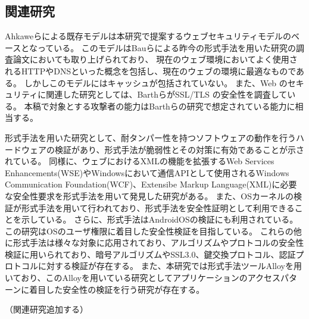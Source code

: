 \documentclass{css}
\begin{document}
\subsection{関連研究}
Ahkaweらによる既存モデル\cite{webmodel}は本研究で提案するウェブセキュリティモデルのベースとなっている。
このモデルはBauらによる昨今の形式手法を用いた研究の調査論文\cite{security_modeling_and_analysis}においても取り上げられており、
現在のウェブ環境においてよく使用されるHTTPやDNSといった概念を包括し、現在のウェブの環境に最適なものである。
しかしこのモデルにはキャッシュが包括されていない。
また、Web のセキュリティに関連した研究としては、Barthら\cite{securing_frame_communication_in_browsers}がSSL/TLS の安全性を調査している。
本稿で対象とする攻撃者の能力はBarthらの研究で想定されている能力に相当する。




形式手法を用いた研究として、耐タンパー性を持つソフトウェアの動作を行うハードウェアの検証\cite{specifying_and_verifying_hardware_for}があり、形式手法が脆弱性とその対策に有効であることが示されている。
\color{red}
同様に、ウェブにおけるXMLの機能を拡張するWeb Services Enhancements(WSE)やWindowsにおいて通信APIとして使用されるWindows Communication Foundation(WCF)、Extensibe Markup Language(XML)に必要な安全性要求を形式手法を用いて発見した研究\cite{TFFWS27,TFFWS28}がある。
\color{black}
また、OSカーネルの検証\cite{sel4_formal_verification_of_an}が形式手法を用いて行われており、形式手法を安全性証明として利用できることを示している。
さらに、形式手法はAndroidOSの検証\cite{towards_formal_analysis_of_the}にも利用されている。この研究はOSのユーザ権限に着目した安全性検証を目指している。
これらの他に形式手法は様々な対象に応用されており、アルゴリズムやプロトコルの安全性検証に用いられており、暗号アルゴリズムやSSL3.0、鍵交換プロトコル、認証プロトコルに対する検証が存在する\cite{TFFWS17,TFFWS18,TFFWS19,TFFWS20}。
\color{red}
また、本研究では形式手法ツールAlloyを用いており、このAlloyを用いている研究としてアプリケーションのアクセスパターンに着目した安全性の検証を行う研究\cite{finding_security_bugs_in_web}が存在する。
\color{black}

\color{red}
（関連研究追加する）
\color{black}
\end{document}
